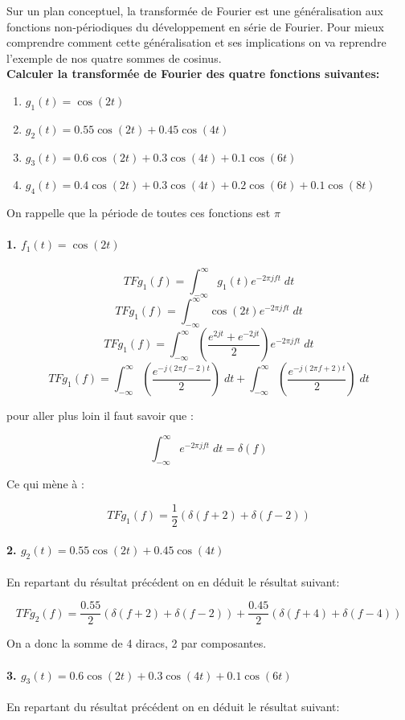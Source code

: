 \documentclass[11pt,a4paper]{article}
\begin{document}
Sur un plan conceptuel, la transformée de Fourier est une généralisation aux fonctions non-périodiques du développement en série de Fourier. Pour mieux comprendre comment cette généralisation et ses implications on va reprendre l'exemple de nos quatre sommes de cosinus.\\

\textbf{Calculer la transformée de Fourier des quatre fonctions suivantes:}
\begin{enumerate}
\item $g_1(t) = \cos(2 t)$
\item $g_2(t) = 0.55 \cos(2 t) + 0.45 \cos(4 t)$
\item $g_3(t) = 0.6 \cos(2 t) + 0.3 \cos(4 t) + 0.1 \cos(6 t)$
\item $g_4(t) = 0.4 \cos(2 t) + 0.3 \cos(4 t) + 0.2 \cos(6 t) + 0.1 \cos(8 t) $
\end{enumerate} 
On rappelle que la période de toutes ces fonctions est $\pi$

\paragraph{1. $f_1(t) = \cos(2 t)$}
 \[TF{g_1}(f) = \int^{\infty}_{-\infty} g_1(t) e^{-2\pi j f t} \; dt\]
 \[TF{g_1}(f) = \int^{\infty}_{-\infty} \cos(2 t) e^{-2\pi j f t} \; dt\]
\[TF{g_1}(f) = \int^{\infty}_{-\infty} (\frac{e^{2jt} +  e^{-2jt}}{2}) e^{-2\pi j f t} \; dt\]
\[TF{g_1}(f) = \int^{\infty}_{-\infty} (\frac{e^{-j(2 \pi f -2)t}}{2}) \; dt + \int^{\infty}_{-\infty} (\frac{e^{-j(2 \pi f +2)t}}{2}) \; dt\]

pour aller plus loin il faut savoir que : 

 \[\int^{\infty}_{-\infty}  e^{-2\pi j f t} \; dt = \delta(f)\]
 
Ce qui mène à :

\[TF{g_1}(f) = \frac{1}{2}(\delta(f+2) + \delta(f-2))\]

\paragraph{2. $g_2(t) = 0.55 \cos(2 t) + 0.45 \cos(4 t)$}
En repartant du résultat précédent on en déduit le résultat suivant:

\[TF{g_2}(f) = \frac{0.55}{2}(\delta(f+2) + \delta(f-2)) + \frac{0.45}{2}(\delta(f+4) + \delta(f-4))\]

On a donc la somme de 4 diracs, 2 par composantes.

\paragraph{3. $g_3(t) = 0.6 \cos(2 t) + 0.3 \cos(4 t) + 0.1 \cos(6 t)$}
En repartant du résultat précédent on en déduit le résultat suivant:
\end{document}
